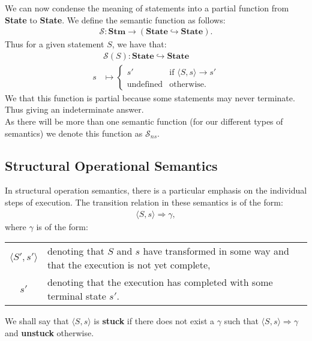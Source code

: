 \documentclass[a4paper, 12pt, twoside]{article}
\begin{document}
We can now condense the meaning of statements into a partial
function from \textbf{State} to \textbf{State}. We define the semantic
function as follows: \begin{gather*}
  \mathcal{S}: \textbf{Stm} \to (\textbf{State} \hookrightarrow \textbf{State}).
\end{gather*} Thus for a given statement $S$, we have that: \begin{align*}
  &\mathcal{S}(S) : \textbf{State} \hookrightarrow \textbf{State} \\
  s &\mapsto \begin{cases}
    s' & \text{if } \langle S, s \rangle \to s' \\
    \text{undefined} & \text{otherwise}.
  \end{cases}
\end{align*} We that this function is partial because some statements
may never terminate. Thus giving an indeterminate answer.
\\[\baselineskip]
As there will be more than one semantic function (for our different types
of semantics) we denote this function as $\mathcal{S}_{ns}$.

\subsection{Structural Operational Semantics}

In structural operation semantics, there is a particular emphasis
on the individual steps of execution. The transition relation in
these semantics is of the form: \begin{gather*}
  \langle S, s \rangle \Rightarrow \gamma,
\end{gather*} where $\gamma$ is of the form:
\begin{center}
\renewcommand{\arraystretch}{1.5}
\begin{tabular}{ | c || p{8.5cm} | }
  \hline
  $\langle S', s' \rangle$ & denoting that $S$ and $s$
  have transformed in some way and that the execution is not
  yet complete, \\
  $s'$ & denoting that the execution has completed with some 
  terminal state $s'$. \\
  \hline
\end{tabular}
\end{center}

\noindent
We shall say that $\langle S, s \rangle$ is \textbf{stuck} if there
does not exist a $\gamma$ such that $\langle S, s \rangle
\Rightarrow \gamma$ and \textbf{unstuck} otherwise. 
\end{document}
